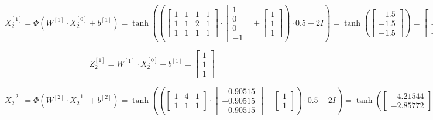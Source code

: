 \documentclass{article}
\begin{document}
\[ X^{[1]}_2 = \Phi(W^{[1]} \cdot X^{[0]}_2 + b^{[1]}) = \tanh \left( \left(\begin{bmatrix} 1 & 1 & 1 & 1 \\ 1 & 1 & 2 & 1 \\ 1 & 1 & 1 & 1 \end{bmatrix} \cdot \begin{bmatrix} 1 \\ 0 \\ 0 \\ -1 \end{bmatrix} + \begin{bmatrix} 1 \\ 1 \\ 1 \end{bmatrix} \right) \cdot 0.5 - 2I \right) = \tanh \left( \begin{bmatrix} -1.5 \\ -1.5 \\ -1.5 \end{bmatrix} \right)  = \begin{bmatrix} -0.90515 \\ -0.90515 \\ -0.90515 \end{bmatrix} \]

\[ Z^{[1]}_2 = W^{[1]} \cdot X^{[0]}_2 + b^{[1]} = \begin{bmatrix} 1 \\ 1 \\ 1 \end{bmatrix} \]

\[ X^{[2]}_2 = \Phi(W^{[2]} \cdot X^{[1]}_2 + b^{[2]}) = \tanh \left( \left(\begin{bmatrix} 1 & 4 & 1 \\ 1 & 1 & 1 \end{bmatrix} \cdot \begin{bmatrix} -0.90515 \\ -0.90515 \\ -0.90515 \end{bmatrix} + \begin{bmatrix} 1 \\ 1 \end{bmatrix} \right) \cdot 0.5 - 2I \right) = \tanh \left( \begin{bmatrix} -4.21544 \\ -2.85772 \end{bmatrix} \right)  = \begin{bmatrix} -0.99956 \\ -0.99343 \end{bmatrix} \]
\end{document}
